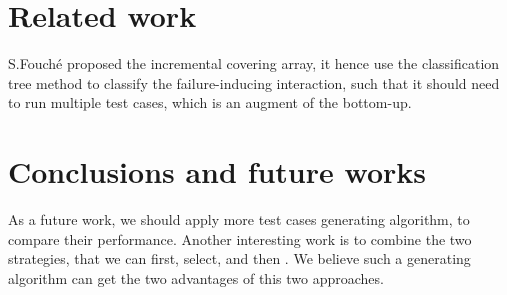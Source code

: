 \documentclass[conference]{IEEEtran}
\theoremstyle{definition}
\begin{document}
\section{Related work}

S.Fouch{\'e} \cite{fouche2009incremental} proposed the incremental covering array, it hence use the classification tree method to classify the failure-inducing interaction, such that it should need to run multiple test cases, which is an augment of the bottom-up.


\section{Conclusions and future works}


As a future work, we should apply more test cases generating algorithm, to compare their performance. Another interesting work is to combine the two strategies, that we can first, select, and then . We believe such a generating algorithm can get the two advantages of this two approaches.

%
%

\end{document}
